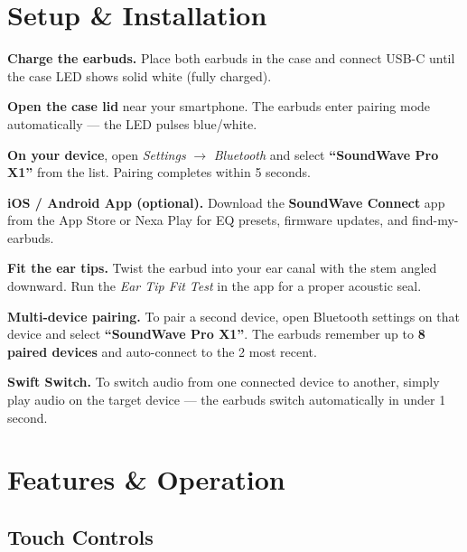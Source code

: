 \section{Setup \& Installation}

\begin{steps}
  \item \textbf{Charge the earbuds.} Place both earbuds in the case and connect USB-C until
    the case LED shows solid white (fully charged).
  \item \textbf{Open the case lid} near your smartphone. The earbuds enter pairing mode
    automatically — the LED pulses blue/white.
  \item \textbf{On your device}, open \textit{Settings} $\to$ \textit{Bluetooth} and select
    \textbf{``SoundWave Pro X1''} from the list. Pairing completes within 5 seconds.
  \item \textbf{iOS / Android App (optional).} Download the \textbf{SoundWave Connect} app
    from the App Store or Nexa Play for EQ presets, firmware updates, and find-my-earbuds.
  \item \textbf{Fit the ear tips.} Twist the earbud into your ear canal with the stem angled
    downward. Run the \textit{Ear Tip Fit Test} in the app for a proper acoustic seal.
  \item \textbf{Multi-device pairing.} To pair a second device, open Bluetooth settings on
    that device and select \textbf{``SoundWave Pro X1''}. The earbuds remember up to
    \textbf{8 paired devices} and auto-connect to the 2 most recent.
\end{steps}

\begin{tipbox}
  \textbf{Swift Switch.} To switch audio from one connected device to another, simply play
  audio on the target device — the earbuds switch automatically in under 1 second.
\end{tipbox}

\section[Features \& Operation]{Features \& Operation\label{sec:features}}

\subsection{Touch Controls}

